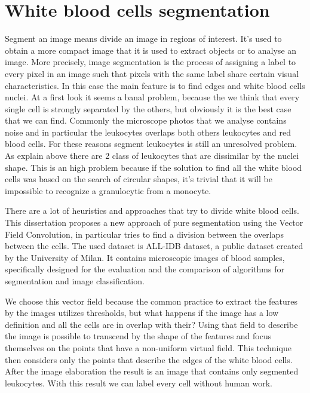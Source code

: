 \section*{White blood cells segmentation}
Segment an image means divide an image in regions of interest. It's used to obtain a more compact image that it is used to extract objects or to analyse an image. More precisely, image segmentation is the process of assigning a label to every pixel in an image such that pixels with the same label share certain visual characteristics. In this case the main feature is to find edges and white blood cells nuclei. At a first look it seems a banal problem, because the we think that every single cell is strongly separated by the others, but obviously it is the best case that we can find. Commonly the microscope photos that we analyse contains noise and in particular the leukocytes overlaps both others leukocytes and red blood cells. For these reasons segment leukocytes is still an unresolved problem. As explain above there are 2 class of leukocytes that are dissimilar by the nuclei shape. This is an high problem because if the solution to find all the white blood cells was based on the search of circular shapes, it's trivial that it will be impossible to recognize a granulocytic from a monocyte.


\bigskip


There are a lot of heuristics and approaches that try to divide white blood cells. This dissertation proposes a new approach of pure segmentation using the Vector Field Convolution, in particular tries to find a division between the overlaps between the cells. The used dataset is ALL-IDB dataset, a public dataset created by the University of Milan. It contains microscopic images of blood samples, specifically designed for the evaluation and the comparison of algorithms for segmentation and image classification.


\bigskip 


We choose this vector field because the common practice to extract the features by the images utilizes thresholds, but what happens if the image has a low definition and all the cells are in overlap with their? Using that field to describe the image is possible to transcend by the shape of the features and focus themselves on the points that have a non-uniform virtual field. This technique then considers only the points that describe the edges of the white blood cells. After the image elaboration the result is an image that contains only segmented leukocytes. With this result we can label every cell without human work.



